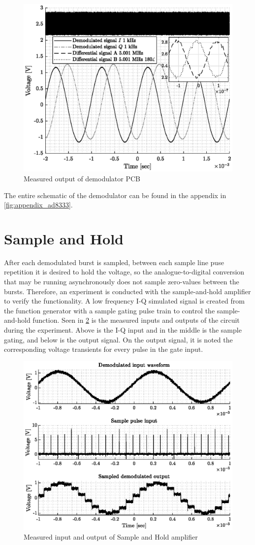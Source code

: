 \begin{figure}[htbp]
	\centering
	\includegraphics[width=.8\textwidth]{Figures/4_demod_pcb_out.eps}
	\caption[Measured output of demodulator PCB]{Measured output of demodulator PCB}
	\label{fig:4_demod_out}
\end{figure}
The entire schematic of the demodulator can be found in the appendix in \cref{fig:appendix_ad8333}.
\section{Sample and Hold}
After each demodulated burst is sampled, between each sample line puse repetition it is desired to hold the voltage, so the analogue-to-digital conversion that may be running asynchronously does not sample zero-values between the bursts. Therefore, an experiment is conducted with the sample-and-hold amplifier to verify the functionality. A low frequency I-Q simulated signal is created from the function generator with a sample gating pulse train to control the sample-and-hold function. Seen in \cref{fig:4_sample_hold_pcb} is the measured inputs and outputs of the circuit during the experiment. Above is the I-Q input and in the middle is the sample gating, and below is the output signal. On the output signal, it is noted the corresponding voltage transients for every pulse in the gate input.
\begin{figure}[htbp]
	\centering
	\includegraphics[width=.8\textwidth]{Figures/4_sampler_pcb.eps}
	\caption{Measured input and output of Sample and Hold amplifier}
	\label{fig:4_sample_hold_pcb}
\end{figure}

